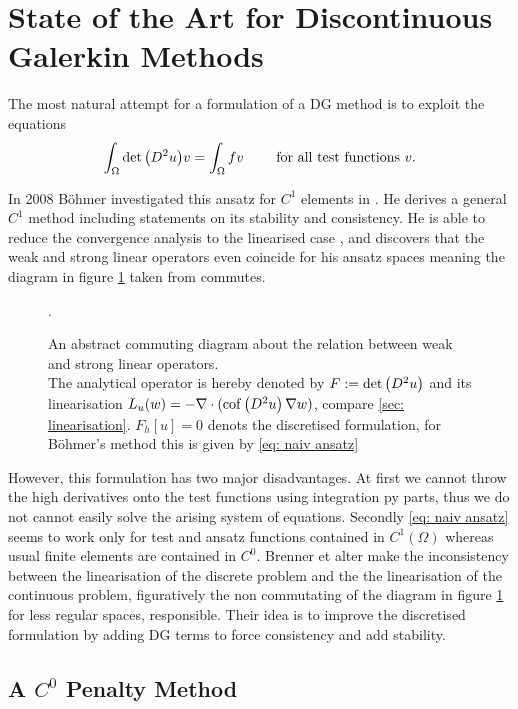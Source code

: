 \section{State of the Art for Discontinuous Galerkin Methods} %

The most natural attempt for a formulation of a DG method is to exploit the equations
\begin{align}
	\int_{\Omega} \det{\left(D^2 u\right)} v = \int_\Omega fv \qquad \text{ for all test functions } v. \label{eq: naiv ansatz}
\end{align}

In 2008 B\"ohmer investigated this ansatz for $C^1$ elements in \cite{Boehmer2008}. He derives a general $C^1$ method including statements on its stability and consistency. He is able to reduce the convergence analysis to the linearised case \cite[Section 9]{Boehmer2008}, and discovers that the weak and strong linear operators even coincide for his ansatz spaces meaning the diagram in figure \ref{fig: fe diagram} taken from \cite[Fig 2.2]{FGN2013} commutes.

\begin{figure}[H]
	
	\label{fig: fe diagram}
	\caption{An abstract commuting diagram about the relation between weak and strong linear operators.\\ The analytical \MA operator is hereby denoted by $F:=\det{\left(D^2 u\right)}$ and its linearisation $L_u(w) = -\nabla \cdot (\operatorname{cof} \left( D^2 u \right) \nabla w)$, compare \ref{sec: linearisation}. $F_h[u]=0$ denots the discretised formulation, for B\"ohmer's method this is given by \eqref{eq: naiv ansatz}}.
\end{figure}

However, this formulation has two major disadvantages. 
At first we cannot throw the high derivatives onto the test functions using integration py parts, thus we do not cannot easily solve the arising system of equations. Secondly \eqref{eq: naiv ansatz} seems to work only for test and ansatz functions contained in $C^1(\Omega)$ whereas usual finite elements are contained in $C^0$. Brenner et alter make the inconsistency between the linearisation of the discrete problem and the the linearisation of the continuous problem, figuratively the non commutating of the diagram in figure \ref{fig: fe diagram} for less regular spaces,  responsible\cite{BGN+2011}. Their idea is to improve the discretised formulation by adding DG terms to force consistency and add stability.

\subsection{A $C^0$ Penalty Method }

